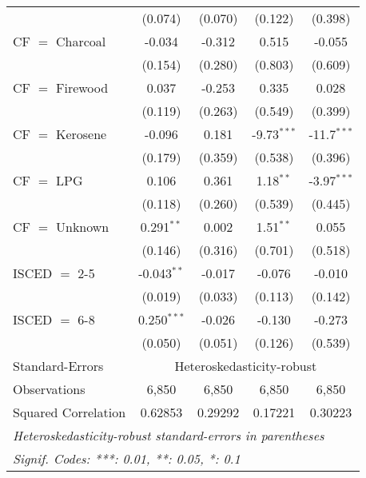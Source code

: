 \begin{table}[htbp!]
\begin{adjustbox}{width = 1\textwidth, max height = 0.95\textheight, center}
\begin{threeparttable}[b]
\begin{tabular}{lcccc}
                                 & (0.074)            & (0.070)            & (0.122)        & (0.398)\\   
            CF $=$ Charcoal      & -0.034             & -0.312             & 0.515          & -0.055\\   
                                 & (0.154)            & (0.280)            & (0.803)        & (0.609)\\   
            CF $=$ Firewood      & 0.037              & -0.253             & 0.335          & 0.028\\   
                                 & (0.119)            & (0.263)            & (0.549)        & (0.399)\\   
            CF $=$ Kerosene      & -0.096             & 0.181              & -9.73$^{***}$  & -11.7$^{***}$\\   
                                 & (0.179)            & (0.359)            & (0.538)        & (0.396)\\   
            CF $=$ LPG           & 0.106              & 0.361              & 1.18$^{**}$    & -3.97$^{***}$\\   
                                 & (0.118)            & (0.260)            & (0.539)        & (0.445)\\   
            CF $=$ Unknown       & 0.291$^{**}$       & 0.002              & 1.51$^{**}$    & 0.055\\   
                                 & (0.146)            & (0.316)            & (0.701)        & (0.518)\\   
            ISCED $=$ 2-5        & -0.043$^{**}$      & -0.017             & -0.076         & -0.010\\   
                                 & (0.019)            & (0.033)            & (0.113)        & (0.142)\\   
            ISCED $=$ 6-8        & 0.250$^{***}$      & -0.026             & -0.130         & -0.273\\   
                                 & (0.050)            & (0.051)            & (0.126)        & (0.539)\\   
            \midrule 
            Standard-Errors & \multicolumn{4}{c}{Heteroskedasticity-robust} \\ 
            Observations         & 6,850              & 6,850              & 6,850          & 6,850\\  
            Squared Correlation  & 0.62853            & 0.29292            & 0.17221        & 0.30223\\  
            \midrule \midrule
            \multicolumn{5}{l}{\emph{Heteroskedasticity-robust standard-errors in parentheses}}\\
            \multicolumn{5}{l}{\emph{Signif. Codes: ***: 0.01, **: 0.05, *: 0.1}}\\
         \end{tabular}
         

\end{threeparttable}
\end{adjustbox}
\end{table}
